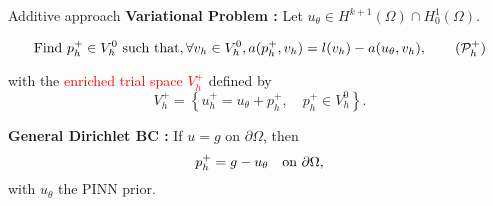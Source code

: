 \begin{frame}{Additive approach}
	\textbf{Variational Problem :} Let $u_{\theta} \in H^{k+1}(\Omega)\cap H^1_0(\Omega)$.
	
	\vspace{-5pt}
	\begin{equation}
		\label{eq:weakplus}
		\text{Find } p_h^+ \in V_h^0 \text{ such that}, \forall v_h \in V_h^0, a(p_h^+,v_h) = l(v_h) - a(u_{\theta},v_h),\tag{$\mathcal{P}_h^+$}
	\end{equation}
	
	\vspace{5pt}
	\begin{minipage}[t]{0.6\linewidth}
		with the \textcolor{red}{enriched trial space $V_h^+$} defined by
		\begin{equation*}
			V_h^+ = \left\{
			u_h^+= u_{\theta} + p_h^+, \quad p_h^+ \in V_h^0
			\right\}.
		\end{equation*}
	
		\vspace{20pt}
	
		\textbf{General Dirichlet BC :} If $u=g$ on $\partial \Omega$, then
		\[
			p_h^+ = g - u_{\theta} \text{\quad on } \partial \Omega,
		\]
		with $u_\theta$ the PINN prior. 
	\end{minipage} \qquad \begin{minipage}[t][][b]{0.28\linewidth}
		\vspace{-8pt}
		\centering
	\end{minipage}
\end{frame}

